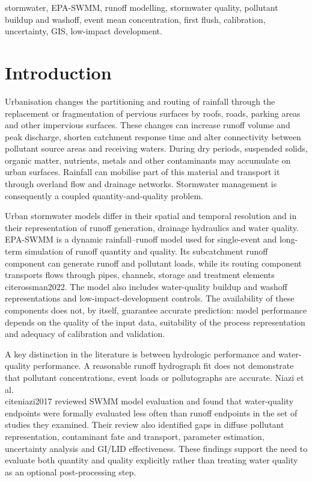 \documentclass[journal]{IEEEtran}
\begin{document}
\begin{IEEEkeywords}\nUrban stormwater, EPA-SWMM, runoff modelling, stormwater quality, pollutant buildup and washoff, event mean concentration, first flush, calibration, uncertainty, GIS, low-impact development.\n\end{IEEEkeywords}


\section{Introduction}
Urbanisation changes the partitioning and routing of rainfall through the replacement or fragmentation of pervious surfaces by roofs, roads, parking areas and other impervious surfaces. These changes can increase runoff volume and peak discharge, shorten catchment response time and alter connectivity between pollutant source areas and receiving waters. During dry periods, suspended solids, organic matter, nutrients, metals and other contaminants may accumulate on urban surfaces. Rainfall can mobilise part of this material and transport it through overland flow and drainage networks. Stormwater management is consequently a coupled quantity-and-quality problem.

Urban stormwater models differ in their spatial and temporal resolution and in their representation of runoff generation, drainage hydraulics and water quality. EPA-SWMM is a dynamic rainfall--runoff model used for single-event and long-term simulation of runoff quantity and quality. Its subcatchment runoff component can generate runoff and pollutant loads, while its routing component transports flows through pipes, channels, storage and treatment elements \\cite{rossman2022}. The model also includes water-quality buildup and washoff representations and low-impact-development controls. The availability of these components does not, by itself, guarantee accurate prediction: model performance depends on the quality of the input data, suitability of the process representation and adequacy of calibration and validation.

A key distinction in the literature is between hydrologic performance and water-quality performance. A reasonable runoff hydrograph fit does not demonstrate that pollutant concentrations, event loads or pollutographs are accurate. Niazi et al. \\cite{niazi2017} reviewed SWMM model evaluation and found that water-quality endpoints were formally evaluated less often than runoff endpoints in the set of studies they examined. Their review also identified gaps in diffuse pollutant representation, contaminant fate and transport, parameter estimation, uncertainty analysis and GI/LID effectiveness. These findings support the need to evaluate both quantity and quality explicitly rather than treating water quality as an optional post-processing step.
\end{document}
